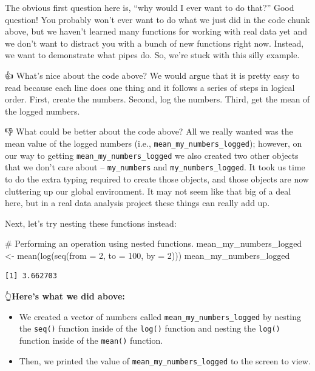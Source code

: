 \documentclass[
  letterpaper,
  DIV=11,
  numbers=noendperiod]{scrreprt}
\newenvironment{Shaded}{\begin{snugshade}}{\end{snugshade}}
\newcommand{\AttributeTok}[1]{\textcolor[rgb]{0.40,0.45,0.13}{#1}}
\newcommand{\CommentTok}[1]{\textcolor[rgb]{0.37,0.37,0.37}{#1}}
\newcommand{\DecValTok}[1]{\textcolor[rgb]{0.68,0.00,0.00}{#1}}
\newcommand{\FunctionTok}[1]{\textcolor[rgb]{0.28,0.35,0.67}{#1}}
\newcommand{\NormalTok}[1]{\textcolor[rgb]{0.00,0.23,0.31}{#1}}
\newcommand{\OtherTok}[1]{\textcolor[rgb]{0.00,0.23,0.31}{#1}}
\begin{document}
The obvious first question here is, ``why would I ever want to do
that?'' Good question! You probably won't ever want to do what we just
did in the code chunk above, but we haven't learned many functions for
working with real data yet and we don't want to distract you with a
bunch of new functions right now. Instead, we want to demonstrate what
pipes do. So, we're stuck with this silly example.

👍 What's nice about the code above? We would argue that it is pretty
easy to read because each line does one thing and it follows a series of
steps in logical order. First, create the numbers. Second, log the
numbers. Third, get the mean of the logged numbers.

👎 What could be better about the code above? All we really wanted was
the mean value of the logged numbers (i.e.,
\texttt{mean\_my\_numbers\_logged}); however, on our way to getting
\texttt{mean\_my\_numbers\_logged} we also created two other objects
that we don't care about -- \texttt{my\_numbers} and
\texttt{my\_numbers\_logged}. It took us time to do the extra typing
required to create those objects, and those objects are now cluttering
up our global environment. It may not seem like that big of a deal here,
but in a real data analysis project these things can really add up.

Next, let's try nesting these functions instead:

\begin{Shaded}
\begin{Highlighting}[]
\CommentTok{\# Performing an operation using nested functions.}
\NormalTok{mean\_my\_numbers\_logged }\OtherTok{\textless{}{-}} \FunctionTok{mean}\NormalTok{(}\FunctionTok{log}\NormalTok{(}\FunctionTok{seq}\NormalTok{(}\AttributeTok{from =} \DecValTok{2}\NormalTok{, }\AttributeTok{to =} \DecValTok{100}\NormalTok{, }\AttributeTok{by =} \DecValTok{2}\NormalTok{)))}
\NormalTok{mean\_my\_numbers\_logged}
\end{Highlighting}
\end{Shaded}

\begin{verbatim}
[1] 3.662703
\end{verbatim}

👆\textbf{Here's what we did above:}

\begin{itemize}
\item
  We created a vector of numbers called
  \texttt{mean\_my\_numbers\_logged} by nesting the \texttt{seq()}
  function inside of the \texttt{log()} function and nesting the
  \texttt{log()} function inside of the \texttt{mean()} function.
\item
  Then, we printed the value of \texttt{mean\_my\_numbers\_logged} to
  the screen to view.
\end{itemize}
\end{document}

